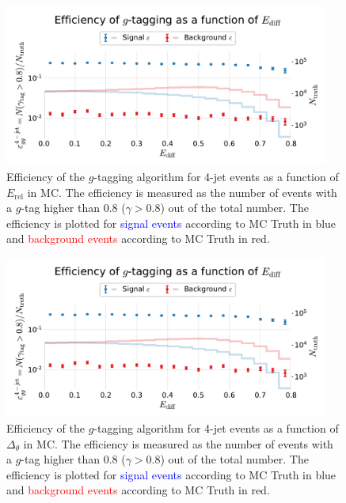 \begin{figure}
  \centerfloat
  \includegraphics[width=0.95\textwidth, trim=10 10 10 45, clip, page=3]{figures/quarks/efficiency_events-down_sample=1.00-ML_vars=vertex-selection=b-ejet_min=4-n_iter_RS_lgb=99-n_iter_RS_xgb=9-cdot_cut=0.90-version=19-njet=4.pdf}
  \caption[$g$-Tagging Efficiency for 4-Jet Events in MC as a Function of $E_\mathrm{rel}$]
          {Efficiency of the $g$-tagging algorithm for 4-jet events as a function of $E_\mathrm{rel}$  in MC. The efficiency is measured as the number of events with a $g$-tag higher than 0.8 ($\gamma > 0.8$) out of the total number. The efficiency is plotted for \textcolor{blue}{signal events} according to MC Truth in blue and \textcolor{red}{background events} according to MC Truth in red.
          } 
  \label{fig:q:effiency_gtag_E_rel}
\end{figure}
\begin{figure}
  \centerfloat
  \includegraphics[width=0.95\textwidth, trim=10 10 10 45, clip, page=4]{figures/quarks/efficiency_events-down_sample=1.00-ML_vars=vertex-selection=b-ejet_min=4-n_iter_RS_lgb=99-n_iter_RS_xgb=9-cdot_cut=0.90-version=19-njet=4.pdf}
  \caption[$g$-Tagging Efficiency for 4-Jet Events in MC as a Function of $\Delta_\theta$]
          {Efficiency of the $g$-tagging algorithm for 4-jet events as a function of $\Delta_\theta$  in MC. The efficiency is measured as the number of events with a $g$-tag higher than 0.8 ($\gamma > 0.8$) out of the total number. The efficiency is plotted for \textcolor{blue}{signal events} according to MC Truth in blue and \textcolor{red}{background events} according to MC Truth in red.
          } 
  \label{fig:q:effiency_gtag_delta_theta}
\end{figure}

